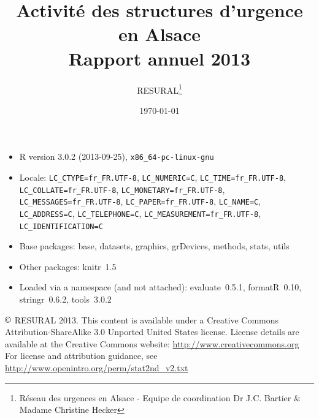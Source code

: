 \documentclass[12pt,english,french,twoside]{report}\usepackage[]{graphicx}\usepackage[]{color}
\begin{document}

\title{Activité des structures d'urgence en Alsace \\Rapport annuel 2013}
\author{RESURAL\thanks{Réseau des urgences en Alsace - Equipe de coordination Dr J.C.
Bartier \& Madame Christine Hecker}}
\date{\today}
\maketitle


\newpage
\chapter*{}
\vfill

\begin{itemize}\raggedright
  \item R version 3.0.2 (2013-09-25), \verb|x86_64-pc-linux-gnu|
  \item Locale: \verb|LC_CTYPE=fr_FR.UTF-8|, \verb|LC_NUMERIC=C|, \verb|LC_TIME=fr_FR.UTF-8|, \verb|LC_COLLATE=fr_FR.UTF-8|, \verb|LC_MONETARY=fr_FR.UTF-8|, \verb|LC_MESSAGES=fr_FR.UTF-8|, \verb|LC_PAPER=fr_FR.UTF-8|, \verb|LC_NAME=C|, \verb|LC_ADDRESS=C|, \verb|LC_TELEPHONE=C|, \verb|LC_MEASUREMENT=fr_FR.UTF-8|, \verb|LC_IDENTIFICATION=C|
  \item Base packages: base, datasets, graphics, grDevices,
    methods, stats, utils
  \item Other packages: knitr~1.5
  \item Loaded via a namespace (and not attached): evaluate~0.5.1,
    formatR~0.10, stringr~0.6.2, tools~3.0.2
\end{itemize}




\noindent $\copyright$ RESURAL 2013. This content is available under a Creative Commons Attribution-ShareAlike 3.0 Unported United States license. License details are available at the Creative Commons website: \url{http://www.creativecommons.org} \\

\noindent For license and attribution guidance, see \url{http://www.openintro.org/perm/stat2nd_v2.txt}
\end{document}

